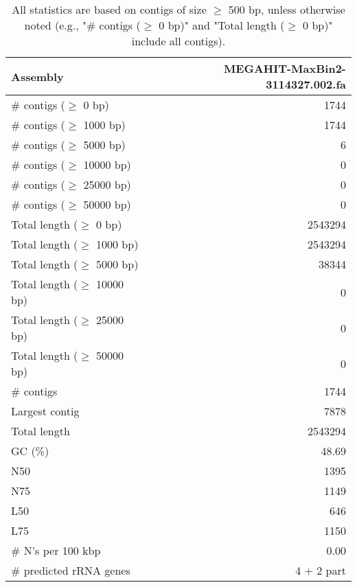 \documentclass[12pt,a4paper]{article}
\begin{document}
\begin{table}[ht]
\begin{center}
\caption{All statistics are based on contigs of size $\geq$ 500 bp, unless otherwise noted (e.g., "\# contigs ($\geq$ 0 bp)" and "Total length ($\geq$ 0 bp)" include all contigs).}
\begin{tabular}{|l*{1}{|r}|}
\hline
Assembly & MEGAHIT-MaxBin2-3114327.002.fa \\ \hline
\# contigs ($\geq$ 0 bp) & 1744 \\ \hline
\# contigs ($\geq$ 1000 bp) & 1744 \\ \hline
\# contigs ($\geq$ 5000 bp) & 6 \\ \hline
\# contigs ($\geq$ 10000 bp) & 0 \\ \hline
\# contigs ($\geq$ 25000 bp) & 0 \\ \hline
\# contigs ($\geq$ 50000 bp) & 0 \\ \hline
Total length ($\geq$ 0 bp) & 2543294 \\ \hline
Total length ($\geq$ 1000 bp) & 2543294 \\ \hline
Total length ($\geq$ 5000 bp) & 38344 \\ \hline
Total length ($\geq$ 10000 bp) & 0 \\ \hline
Total length ($\geq$ 25000 bp) & 0 \\ \hline
Total length ($\geq$ 50000 bp) & 0 \\ \hline
\# contigs & 1744 \\ \hline
Largest contig & 7878 \\ \hline
Total length & 2543294 \\ \hline
GC (\%) & 48.69 \\ \hline
N50 & 1395 \\ \hline
N75 & 1149 \\ \hline
L50 & 646 \\ \hline
L75 & 1150 \\ \hline
\# N's per 100 kbp & 0.00 \\ \hline
\# predicted rRNA genes & 4 + 2 part \\ \hline
\end{tabular}
\end{center}
\end{table}
\end{document}
